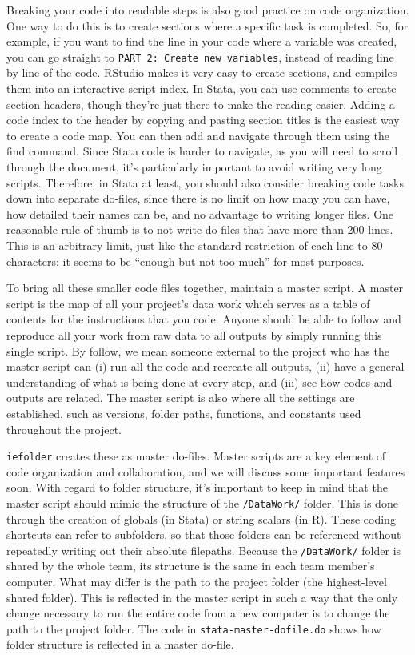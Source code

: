 Breaking your code into readable steps is also good practice on code organization.
One way to do this is to create sections where a specific task is completed.
So, for example, if you want to find the line in your code where a variable was created,
you can go straight to \texttt{PART 2: Create new variables},
instead of reading line by line of the code.
RStudio makes it very easy to create sections, and compiles them into an interactive script index.
In Stata, you can use comments to create section headers,
though they're just there to make the reading easier.
Adding a code index to the header by copying and pasting section titles is the easiest way to create a code map.
You can then add and navigate through them using the find command.
Since Stata code is harder to navigate, as you will need to scroll through the document,
it's particularly important to avoid writing very long scripts.
Therefore, in Stata at least, you should also consider breaking code tasks down
into separate do-files, since there is no limit on how many you can have,
how detailed their names can be, and no advantage to writing longer files.
One reasonable rule of thumb is to not write do-files that have more than 200 lines.
This is an arbitrary limit, just like the standard restriction of each line to 80 characters:
it seems to be ``enough but not too much'' for most purposes.

To bring all these smaller code files together, maintain a master script.
A master script is the map of all your project's data work
which serves as a table of contents for the instructions that you code.
Anyone should be able to follow and reproduce all your work from
raw data to all outputs by simply running this single script.
By follow, we mean someone external to the project who has the master script can
(i) run all the code and recreate all outputs,
(ii) have a general understanding of what is being done at every step, and
(iii) see how codes and outputs are related.
The master script is also where all the settings are established,
such as versions, folder paths, functions, and constants used throughout the project.

\texttt{iefolder} creates these as master do-files.
Master scripts are a key element of code organization and collaboration,
and we will discuss some important features soon.
With regard to folder structure, it's important to keep in mind
that the master script should mimic the structure of the \texttt{/DataWork/} folder.
This is done through the creation of globals (in Stata) or string scalars (in R).
These coding shortcuts can refer to subfolders,
so that those folders can be referenced without repeatedly writing out their absolute filepaths.
Because the \texttt{/DataWork/} folder is shared by the whole team,
its structure is the same in each team member's computer.
What may differ is the path to the project folder (the highest-level shared folder).
This is reflected in the master script in such a way that
the only change necessary to run the entire code from a new computer
is to change the path to the project folder.
The code in \texttt{stata-master-dofile.do} shows how folder structure is reflected in a master do-file.

